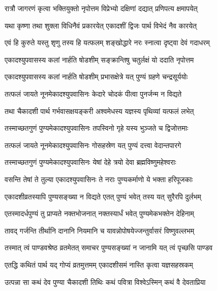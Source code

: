 \twolineshloka
{रात्रौ जागरणं कृत्वा भक्तियुक्तो नृपोत्तम}
{विप्रेभ्यो दक्षिणां दद्यात् प्रणिपत्य क्षमापयेत्}%

\twolineshloka
{यथा कृष्णा तथा शुक्ला विधिनैवं प्रकारयेत्}
{एकादशीं द्विजः पार्थ विभेदं नैव कारयेत्}%

\twolineshloka
{एवं हि कुरुते यस्तु शृणु तस्य हि यत्फलम्}
{शङ्खोद्धारे नरः स्नात्वा दृष्ट्वा देवं गदाधरम्}%

\twolineshloka
{एकादश्युपवासस्य कलां नार्हति षोडशीम्}
{सङ्क्रान्तिषु चतुर्लक्षं यो ददाति नृपोत्तम}%

\twolineshloka
{एकादश्युपवासस्य कलां नार्हति षोडशीम्}
{प्रभासक्षेत्रे यत् पुण्यं ग्रहणे चन्द्रसूर्ययोः}%

\twolineshloka
{तत्फलं जायते नूनमेकादश्युपवासिनः}
{केदारे चोदकं पीत्वा पुनर्जन्म न विद्यते}%

\twolineshloka
{तथा चैकादशी पार्थ गर्भवासक्षयङ्करी}
{अश्वमेधस्य यज्ञस्य पृथिव्यां यत्फलं लभेत्}%

\twolineshloka
{तस्माच्छतगुणं पुण्यमेकादश्युपवासिनः}
{तपस्विनो गृहे यस्य भुञ्जते च द्विजोत्तमाः}%

\twolineshloka
{तत्फलं जायते नूनमेकादश्युपवासिनः}
{गोसहस्रेण यत् पुण्यं दत्त्वा वेदान्तपारगे}%

\twolineshloka
{तस्माच्छतगुणं पुण्यमेकादश्युपवासिनः}
{येषां देहे त्रयो देवा ब्रह्मविष्णुमहेश्वराः}%

\twolineshloka
{वसन्ति तेषां ते तुल्या एकादश्युपवासिनः}
{ते नराः पुण्यकर्माणो ये भक्ता हरिपूजकाः}%

\twolineshloka
{एकादशीव्रतस्यापि पुण्यसङ्ख्या न विद्यते}
{एतत् पुण्यं भवेत् तस्य यत् सुरैरपि दुर्लभम्}%

\twolineshloka
{एतस्मादर्धपुण्यं तु प्राप्यते नक्तभोजनात्}
{नक्तस्यार्धं भवेत् पुण्यमेकभक्तेन देहिनाम्}%

\twolineshloka
{तावद् गर्जन्ति तीर्थानि दानानि नियमानि च}
{यावन्नोपोषयेज्जन्तुर्वासरं विष्णुवल्लभम्}%

\twolineshloka
{तस्मात् त्वं पाण्डवश्रेष्ठ व्रतमेतत् समाचर}
{पुण्यसङ्ख्यां न जानामि यत् त्वं पृच्छसि पाण्डव}%

\twolineshloka
{एतद्धि कथितं पार्थ यद् गोप्यं व्रतमुत्तमम्}
{एकादशीसमं नास्ति कृत्वा यज्ञसहस्रकम्}%


\twolineshloka
{उत्पन्ना सा कथं देव पुण्या चैकादशी तिथिः}
{कथं पवित्रा विश्वेऽस्मिन् कथं वै देवताप्रिया}%


